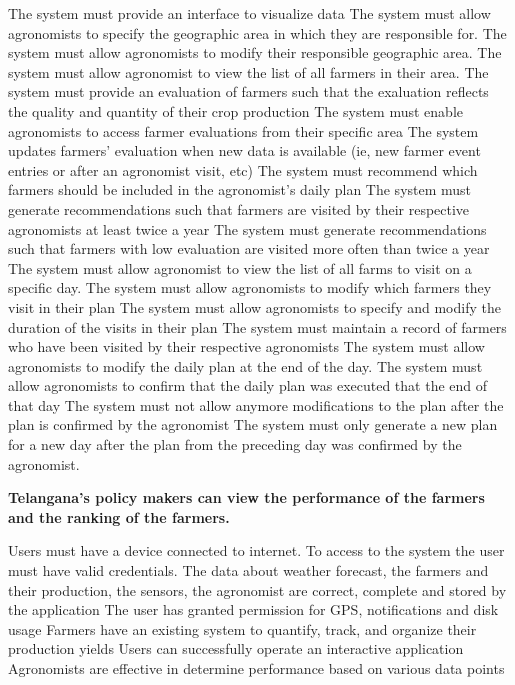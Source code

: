 \begin{itemize}
\begin{itemize}
 The system must provide an interface to visualize data
 The system must allow agronomists to specify the geographic area in which they are responsible for.
 The system must allow agronomists to modify their responsible geographic area.
  The system must allow agronomist to view the list of all farmers in their area.
  The system must provide an evaluation of farmers such that the exaluation reflects the quality and quantity of their crop production
  The system must enable agronomists to access farmer evaluations from their specific area
  The system updates farmers' evaluation when new data is available (ie, new farmer event entries or after an agronomist visit, etc)
  The system must recommend which farmers should be included in the agronomist's daily plan
  The system must generate recommendations such that farmers are visited by their respective agronomists at least twice a year
  The system must generate recommendations such that farmers with low evaluation are visited more often than twice a year
  The system must allow agronomist to view the list of all farms to visit on a specific day.
  The system must allow agronomists to modify which farmers they visit in their plan
  The system must allow agronomists to specify and modify the duration of the visits in their plan
  The system must maintain a record of farmers who have been visited by their respective agronomists
 The system must allow agronomists to modify the daily plan at the end of the day.
 The system must allow agronomists to confirm that the daily plan was executed that the end of that day
 The system must not allow anymore modifications to the plan after the plan is confirmed by the agronomist
 The system must only generate a new plan for a new day after the plan from the preceding day was confirmed by the agronomist.
\end{itemize}

 \textbf{Telangana’s policy makers can view the performance of the farmers and the ranking of the farmers.}
\begin{itemize}
  Users must have a device connected to internet.
 To access to the system the user must have valid credentials.
 The data about weather forecast, the farmers and their production, the sensors, the agronomist are correct, complete and stored by the application
 The user has granted permission for GPS, notifications and disk usage
 Farmers have an existing system to quantify, track, and organize their production yields
 Users can successfully operate an interactive application
 Agronomists are effective in determine performance based on various data points



\end{itemize}
\end{itemize}
